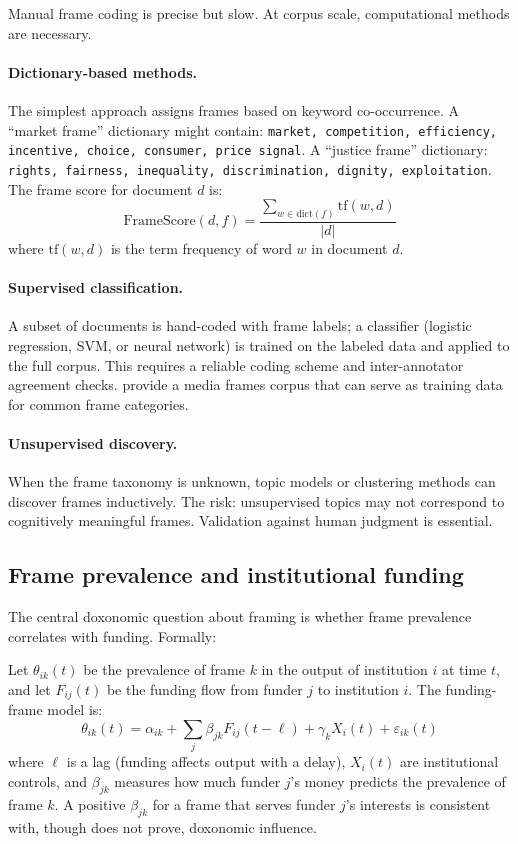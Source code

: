Manual frame coding is precise but slow.
At corpus scale, computational methods are necessary.

\paragraph{Dictionary-based methods.}
The simplest approach assigns frames based on keyword co-occurrence.
A ``market frame'' dictionary might contain: \texttt{market, competition, efficiency, incentive, choice, consumer, price signal}.
A ``justice frame'' dictionary: \texttt{rights, fairness, inequality, discrimination, dignity, exploitation}.
The frame score for document $d$ is:
\[
  \text{FrameScore}(d, f) = \frac{\sum_{w \in \text{dict}(f)} \text{tf}(w, d)}{|d|}
\]
where $\text{tf}(w, d)$ is the term frequency of word $w$ in document $d$.

\paragraph{Supervised classification.}
A subset of documents is hand-coded with frame labels; a classifier (logistic regression, SVM, or neural network) is trained on the labeled data and applied to the full corpus.
This requires a reliable coding scheme and inter-annotator agreement checks.
\textcite{card2015} provide a media frames corpus that can serve as training data for common frame categories.

\paragraph{Unsupervised discovery.}
When the frame taxonomy is unknown, topic models or clustering methods can discover frames inductively.
The risk: unsupervised topics may not correspond to cognitively meaningful frames.
Validation against human judgment is essential.

\subsection{Frame prevalence and institutional funding}

The central doxonomic question about framing is whether frame prevalence correlates with funding.
Formally:

\begin{model}
\label{mod:funding-frame}
Let $\theta_{ik}(t)$ be the prevalence of frame $k$ in the output of institution $i$ at time $t$, and let $F_{ij}(t)$ be the funding flow from funder $j$ to institution $i$.
The funding-frame model is:
\[
  \theta_{ik}(t) = \alpha_{ik} + \sum_{j} \beta_{jk} F_{ij}(t-\ell) + \gamma_k X_{i}(t) + \varepsilon_{ik}(t)
\]
where $\ell$ is a lag (funding affects output with a delay), $X_i(t)$ are institutional controls, and $\beta_{jk}$ measures how much funder $j$'s money predicts the prevalence of frame $k$.
A positive $\beta_{jk}$ for a frame that serves funder $j$'s interests is consistent with, though does not prove, doxonomic influence.
\end{model}

